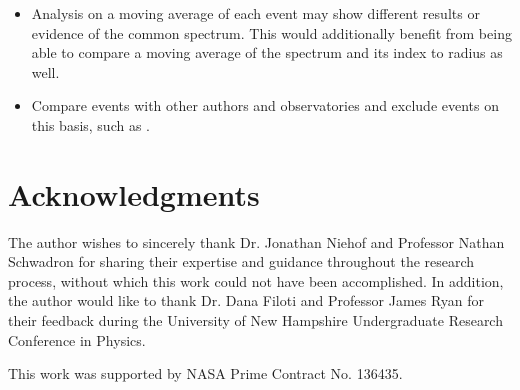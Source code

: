 \documentclass[letterpaper,11pt]{article}
\begin{document}
\begin{itemize}
\item Analysis on a moving average of each event may show different results or evidence of the common spectrum.  This would additionally benefit from being able to compare a moving average of the spectrum and its index to radius as well.
\item Compare events with other authors and observatories and exclude events on this basis, such as \citet{Cohen2020}.
\end{itemize}



\section{Acknowledgments}
The author wishes to sincerely thank Dr. Jonathan Niehof and Professor Nathan Schwadron for sharing their expertise and guidance throughout the research process, without which this work could not have been accomplished. In addition, the author would like to thank Dr. Dana Filoti and Professor James Ryan for their feedback during the University of New Hampshire Undergraduate Research Conference in Physics.

\bigskip

\noindent This work was supported by NASA Prime Contract No. 136435.




%
%

\end{document}
